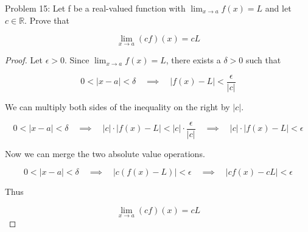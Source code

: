 \usepackage{amsthm}

Problem 15: Let f be a real-valued function with $\lim_{x \rightarrow a} f(x) = L$ and let $c \in \mathbb{R}$. Prove that 

$$ \lim_{x \rightarrow a} (cf)(x) = cL $$

\begin{proof}
Let $\epsilon > 0$. Since $\lim_{x \rightarrow a} f(x) = L$, there exists a $\delta > 0$ such that

$$ 0 < |x - a| < \delta \quad \implies \quad |f(x) - L| < \frac{\epsilon}{|c|} $$

We can multiply both sides of the inequality on the right by $|c|$.

$$ 0 < |x - a| < \delta \quad \implies \quad |c| \cdot |f(x) - L| < |c| \cdot \frac{\epsilon}{|c|} \quad \implies \quad |c| \cdot |f(x) - L| < \epsilon $$

Now we can merge the two absolute value operations.

$$ 0 < |x - a| < \delta \quad \implies \quad |c(f(x) - L)| < \epsilon \quad \implies \quad |cf(x) - cL| < \epsilon $$

Thus

$$ \lim_{x \rightarrow a} (cf)(x) = cL $$
\end{proof}
